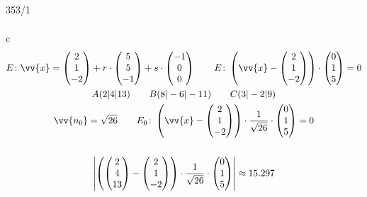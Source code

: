 \begin{exercise}{353/1}
\begin{gather*}
  \end{gather*}
  \item [c]
  \begin{gather*}
    E \colon \vv{x} = \begin{pmatrix}2 \\ 1 \\ -2\end{pmatrix} + r \cdot \begin{pmatrix}5 \\ 5 \\ -1\end{pmatrix} + s \cdot \begin{pmatrix}-1 \\ 0 \\ 0\end{pmatrix} \qquad E \colon \left(\vv{x} - \begin{pmatrix}2 \\ 1 \\ -2\end{pmatrix}\right) \cdot \begin{pmatrix}0 \\ 1 \\ 5\end{pmatrix} = 0 \\
    A(2|4|13) \qquad B(8|-6|-11) \qquad C(3|-2|9) \\
    \vv{n_0} = \sqrt{26} \qquad E_0 \colon \left(\vv{x} - \begin{pmatrix}2 \\ 1 \\ -2\end{pmatrix}\right) \cdot \frac{1}{\sqrt{26}} \cdot \begin{pmatrix}0 \\ 1 \\ 5\end{pmatrix} = 0 \\\\
    \left|\left(\begin{pmatrix}2 \\ 4 \\ 13\end{pmatrix} - \begin{pmatrix}2 \\ 1 \\ -2\end{pmatrix}\right) \cdot \frac{1}{\sqrt{26}} \cdot \begin{pmatrix}0 \\ 1 \\ 5\end{pmatrix}\right| \approx 15.297 \\

\end{gather*}
\end{exercise}
